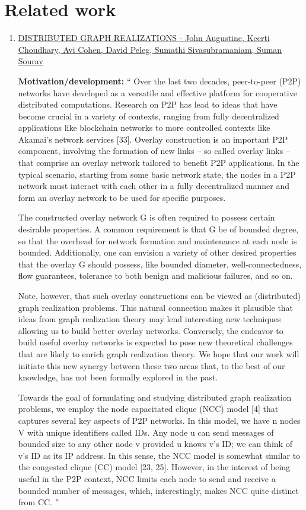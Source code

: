 \documentclass[11pt,a4paper]{article}
\theoremstyle{definition}
\begin{document}
\section{Related work}
\begin{enumerate}

\item \hyperlink{https://arxiv.org/pdf/2002.05376.pdf}
{DISTRIBUTED GRAPH REALIZATIONS - John Augustine, Keerti Choudhary, Avi Cohen, David Peleg, Sumathi Sivasubramaniam, Suman Sourav}

\textbf{Motivation/development:}
``
Over the last two decades, peer-to-peer (P2P) networks have developed as a versatile and effective platform for cooperative distributed computations. Research on P2P has lead to ideas that have become crucial in a variety of contexts,
ranging from fully decentralized applications like blockchain networks to more controlled contexts like Akamai’s
network services [33]. Overlay construction is an important P2P component, involving the formation of new links
– so called overlay links – that comprise an overlay network tailored to benefit P2P applications. In the typical scenario, starting from some basic network state, the nodes in a P2P network must interact with each other in a fully
decentralized manner and form an overlay network to be used for specific purposes.

The constructed overlay network G is often required to possess certain desirable properties. A common requirement
is that G be of bounded degree, so that the overhead for network formation and maintenance at each node is bounded.
Additionally, one can envision a variety of other desired properties that the overlay G should possess, like bounded
diameter, well-connectedness, flow guarantees, tolerance to both benign and malicious failures, and so on.

Note, however, that such overlay constructions can be viewed as (distributed) graph realization problems. This natural
connection makes it plausible that ideas from graph realization theory may lend interesting new techniques allowing
us to build better overlay networks. Conversely, the endeavor to build useful overlay networks is expected to pose new
theoretical challenges that are likely to enrich graph realization theory. We hope that our work will initiate this new
synergy between these two areas that, to the best of our knowledge, has not been formally explored in the past.

Towards the goal of formulating and studying distributed graph realization problems, we employ the node capacitated
clique (NCC) model [4] that captures several key aspects of P2P networks. In this model, we have n nodes V with
unique identifiers called IDs. Any node u can send messages of bounded size to any other node v provided u knows
v’s ID; we can think of v’s ID as its IP address. In this sense, the NCC model is somewhat similar to the congested
clique (CC) model [23, 25]. However, in the interest of being useful in the P2P context, NCC limits each node to send
and receive a bounded number of messages, which, interestingly, makes NCC quite distinct from CC.
''


\end{enumerate}
\end{document}
